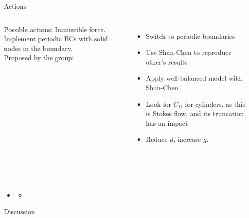 \documentclass[8pt]{beamer}
\begin{document}
	\begin{frame}{Actions}
		\begin{columns}[T]
			
			Possible actions: Immiscible force. Implement periodic BCs with solid nodes in the boundary. ~\\
			
			Proposed by the group:
			\begin{itemize}
				\item Switch to periodic boundaries
				\item Use Shan-Chen to reproduce other's results
				\item Apply well-balanced model with Shan-Chen
				\item Look for $C_D$ for cylinders, as this is Stokes flow, and its truncation has an impact
				\item Reduce $d$, increase $g$. 
				
			\end{itemize}
			
			
		\end{columns}
	\end{frame}

	\begin{frame}{}
		
	\end{frame}
	
	\begin{frame}{}
		\textbf{}\\~\\
		\begin{itemize}
			\item 
			\begin{itemize}
				\item 
			\end{itemize}
		\end{itemize}
	\end{frame}
	\begin{frame}{}
		
	\end{frame}
		\begin{frame}{Discussion}
		\begin{columns}
			
			
			
			
		\end{columns}
	\end{frame}
	
\end{document}
